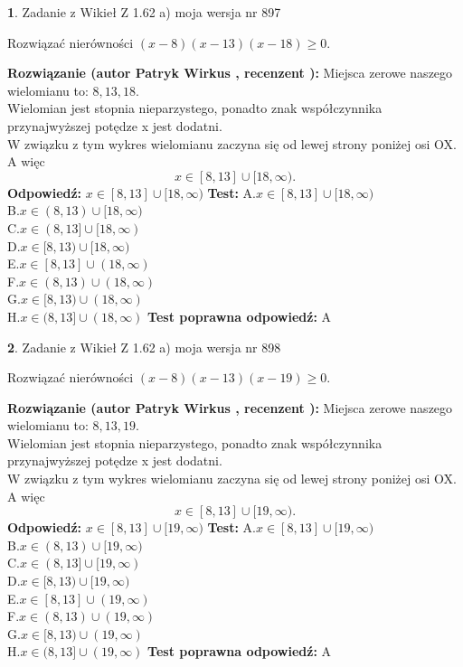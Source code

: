\documentclass[12pt, a4paper]{article}
\theoremstyle{definition} %
\newtheorem{zad}{}
\newcommand{\zadStart}[1]{\begin{zad}#1\newline}
\newcommand{\zadStop}{\end{zad}}
\newcommand{\rozwStart}[2]{\noindent \textbf{Rozwiązanie (autor #1 , recenzent #2): }\newline}
\newcommand{\rozwStop}{\newline}
\newcommand{\odpStart}{\noindent \textbf{Odpowiedź:}\newline}
\newcommand{\odpStop}{\newline}
\newcommand{\testStart}{\noindent \textbf{Test:}\newline}
\newcommand{\testStop}{\newline}
\newcommand{\kluczStart}{\noindent \textbf{Test poprawna odpowiedź:}\newline}
\newcommand{\kluczStop}{\newline}
\begin{document}
\zadStart{Zadanie z Wikieł Z 1.62 a) moja wersja nr 897}

Rozwiązać nierówności $(x-8)(x-13)(x-18)\ge0$.
\zadStop
\rozwStart{Patryk Wirkus}{}
Miejsca zerowe naszego wielomianu to: $8, 13, 18$.\\
Wielomian jest stopnia nieparzystego, ponadto znak współczynnika przy\linebreak najwyższej potędze x jest dodatni.\\ W związku z tym wykres wielomianu zaczyna się od lewej strony poniżej osi OX. A więc $$x \in [8,13] \cup [18,\infty).$$
\rozwStop
\odpStart
$x \in [8,13] \cup [18,\infty)$
\odpStop
\testStart
A.$x \in [8,13] \cup [18,\infty)$\\
B.$x \in (8,13) \cup [18,\infty)$\\
C.$x \in (8,13] \cup [18,\infty)$\\
D.$x \in [8,13) \cup [18,\infty)$\\
E.$x \in [8,13] \cup (18,\infty)$\\
F.$x \in (8,13) \cup (18,\infty)$\\
G.$x \in [8,13) \cup (18,\infty)$\\
H.$x \in (8,13] \cup (18,\infty)$
\testStop
\kluczStart
A
\kluczStop



\zadStart{Zadanie z Wikieł Z 1.62 a) moja wersja nr 898}

Rozwiązać nierówności $(x-8)(x-13)(x-19)\ge0$.
\zadStop
\rozwStart{Patryk Wirkus}{}
Miejsca zerowe naszego wielomianu to: $8, 13, 19$.\\
Wielomian jest stopnia nieparzystego, ponadto znak współczynnika przy\linebreak najwyższej potędze x jest dodatni.\\ W związku z tym wykres wielomianu zaczyna się od lewej strony poniżej osi OX. A więc $$x \in [8,13] \cup [19,\infty).$$
\rozwStop
\odpStart
$x \in [8,13] \cup [19,\infty)$
\odpStop
\testStart
A.$x \in [8,13] \cup [19,\infty)$\\
B.$x \in (8,13) \cup [19,\infty)$\\
C.$x \in (8,13] \cup [19,\infty)$\\
D.$x \in [8,13) \cup [19,\infty)$\\
E.$x \in [8,13] \cup (19,\infty)$\\
F.$x \in (8,13) \cup (19,\infty)$\\
G.$x \in [8,13) \cup (19,\infty)$\\
H.$x \in (8,13] \cup (19,\infty)$
\testStop
\kluczStart
A
\kluczStop
\end{document}

